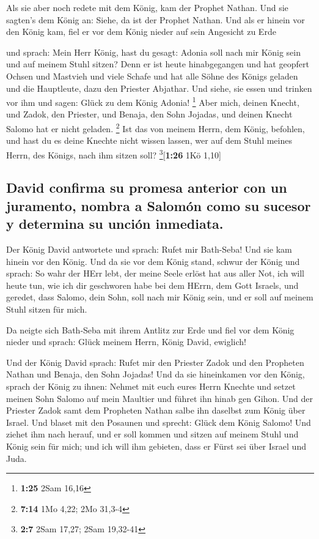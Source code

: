  Als sie aber noch redete mit dem König, kam der Prophet
Nathan.  Und sie sagten's dem König an: Siehe, da ist der
Prophet Nathan. Und als er hinein vor den König kam, fiel er vor dem
König nieder auf sein Angesicht zu Erde

 und sprach: Mein Herr König, hast du gesagt: Adonia soll
nach mir König sein und auf meinem Stuhl sitzen?  Denn er
ist heute hinabgegangen und hat geopfert Ochsen und Mastvieh und viele
Schafe und hat alle Söhne des Königs geladen und die Hauptleute, dazu
den Priester Abjathar. Und siehe, sie essen und trinken vor ihm und
sagen: Glück zu dem König Adonia! \footnote{\textbf{1:25} 2Sam 16,16}
 Aber mich, deinen Knecht, und Zadok, den Priester, und
Benaja, den Sohn Jojadas, und deinen Knecht Salomo hat er nicht geladen.
\footnote{\textbf{7:14} 1Mo 4,22; 2Mo 31,3-4}  Ist das
von meinem Herrn, dem König, befohlen, und hast du es deine Knechte
nicht wissen lassen, wer auf dem Stuhl meines Herrn, des Königs, nach
ihm sitzen soll? \footnote{\textbf{2:7} 2Sam 17,27; 2Sam 19,32-41}{[}\textbf{1:26}
1Kö 1,10{]}

\hypertarget{david-confirma-su-promesa-anterior-con-un-juramento-nombra-a-salomuxf3n-como-su-sucesor-y-determina-su-unciuxf3n-inmediata.}{%
\subsection{David confirma su promesa anterior con un juramento, nombra
a Salomón como su sucesor y determina su unción
inmediata.}\label{david-confirma-su-promesa-anterior-con-un-juramento-nombra-a-salomuxf3n-como-su-sucesor-y-determina-su-unciuxf3n-inmediata.}}

 Der König David antwortete und sprach: Rufet mir
Bath-Seba! Und sie kam hinein vor den König. Und da sie vor dem König
stand,  schwur der König und sprach: So wahr der HErr
lebt, der meine Seele erlöst hat aus aller Not,  ich will
heute tun, wie ich dir geschworen habe bei dem HErrn, dem Gott Israels,
und geredet, dass Salomo, dein Sohn, soll nach mir König sein, und er
soll auf meinem Stuhl sitzen für mich.

 Da neigte sich Bath-Seba mit ihrem Antlitz zur Erde und
fiel vor dem König nieder und sprach: Glück meinem Herrn, König David,
ewiglich!

 Und der König David sprach: Rufet mir den Priester Zadok
und den Propheten Nathan und Benaja, den Sohn Jojadas! Und da sie
hineinkamen vor den König,  sprach der König zu ihnen:
Nehmet mit euch eures Herrn Knechte und setzet meinen Sohn Salomo auf
mein Maultier und führet ihn hinab gen Gihon.  Und der
Priester Zadok samt dem Propheten Nathan salbe ihn daselbst zum König
über Israel. Und blaset mit den Posaunen und sprecht: Glück dem König
Salomo!  Und ziehet ihm nach herauf, und er soll kommen
und sitzen auf meinem Stuhl und König sein für mich; und ich will ihm
gebieten, dass er Fürst sei über Israel und Juda.

